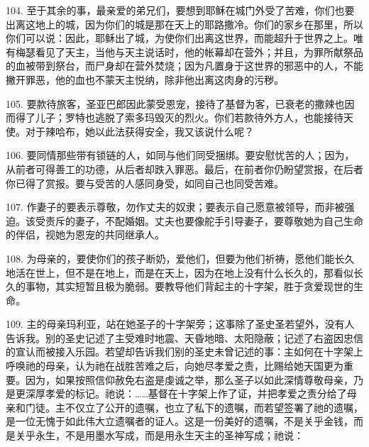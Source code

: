 104. 至于其余的事，最亲爱的弟兄们，要想到耶稣在城门外受了苦难，你们也要出离这地上的城，因为你们的城是那在天上的耶路撒冷。你们的家乡在那里，所以你们可以说：因此，耶稣出了城，为使你们出离这世界，而能超升于世界之上。唯有梅瑟看见了天主，当他与天主说话时，他的帐幕却在营外；并且，为罪所献祭品的血被带到祭台，而尸身却在营外焚烧；因为凡置身于这世界的邪恶中的人，不能撇开罪恶，他的血也不蒙天主悦纳，除非他出离这肉身的污秽。\par

105. 要款待旅客，圣亚巴郎因此蒙受恩宠，接待了基督为客，已衰老的撒辣也因而得了儿子；罗特也逃脱了索多玛毁灭的烈火。你们若款待外方人，也能接待天使。对于辣哈布，她以此法获得安全，我又该说什么呢？\par

106. 要同情那些带有锁链的人，如同与他们同受捆绑。要安慰忧苦的人；因为，从前者可得善工的功德，从后者却跌入罪恶。最后，在前者你仍盼望赏报，在后者你已得了赏报。要与受苦的人感同身受，如同自己也同受苦难。\par

107. 作妻子的要表示尊敬，勿作丈夫的奴隶；要表示自己愿意被领导，而非被强迫。该受责斥的妻子，不配婚姻。丈夫也要像舵手引导妻子，要尊敬她为自己生命的伴侣，视她为恩宠的共同继承人。\par

108. 为母亲的，要使你们的孩子断奶，爱他们，但要为他们祈祷，愿他们能长久地活在世上，但不是在地上，而是在天上，因为在地上没有什么长久的，那看似长久的事物，其实短暂且极为脆弱。要教导他们背起主的十字架，胜于贪爱现世的生命。\par

109. 主的母亲玛利亚，站在她圣子的十字架旁；这事除了圣史圣若望外，没有人告诉我。别的圣史记述了主受难时地震、天昏地暗、太阳隐蔽；记述了右盗因忠信的宣认而被接入乐园。若望却告诉我们别的圣史未曾记述的事：主如何在十字架上呼唤祂的母亲，认为祂在战胜苦难之后，向她尽孝爱之责，比赐给她天国更为重要。因为，如果按照信仰赦免右盗是虔诚之举，那么圣子以如此深情尊敬母亲，乃是更深厚孝爱的标记。祂说：……基督在十字架上作了证，并把孝爱之责分给了母亲和门徒。主不仅立了公开的遗嘱，也立了私下的遗嘱，而若望签署了祂的遗嘱，是一位无愧于如此伟大立遗嘱者的证人。这是一份美好的遗嘱，不是关乎金钱，而是关乎永生，不是用墨水写成，而是用永生天主的圣神写成；祂说：\par

